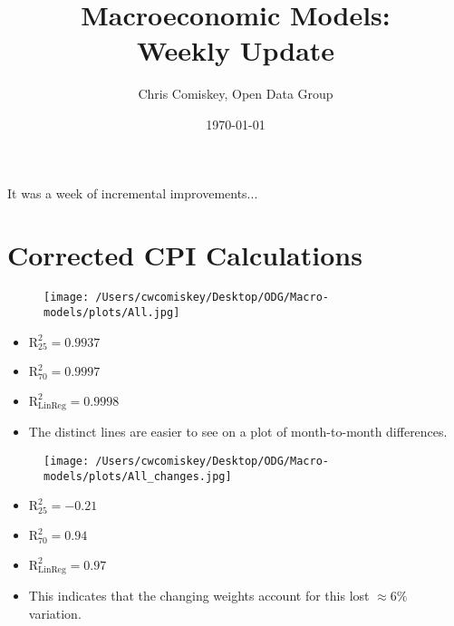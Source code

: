 \documentclass{article}
\title{Macroeconomic Models: \\ Weekly Update}
\author{Chris Comiskey, Open Data Group}
\date{\today}
\begin{document}
\maketitle{}
It was a week of incremental improvements...
\section*{Corrected CPI Calculations}
    \begin{figure}[H]
    \centering
    \texttt{[image: /Users/cwcomiskey/Desktop/ODG/Macro-models/plots/All.jpg]}
    \end{figure}
\begin{itemize}
\item $\text{R}^{2}_{25} = 0.9937$
\item $\text{R}^{2}_{70} = 0.9997$
\item $\text{R}^{2}_{\text{LinReg}} = 0.9998$
\end{itemize}

\begin{itemize}
\item The distinct lines are easier to see on a plot of month-to-month differences.
\end{itemize}
    \begin{figure}[H]
    \centering
    \texttt{[image: /Users/cwcomiskey/Desktop/ODG/Macro-models/plots/All\_changes.jpg]}
    \end{figure}
\begin{itemize}
\item $\text{R}^{2}_{25} = -0.21$
\item $\text{R}^{2}_{70} = 0.94$
\item $\text{R}^{2}_{\text{LinReg}} = 0.97$
\item This indicates that the changing weights account for this lost $\approx 6\%$ variation.
\end{itemize}
\end{document}
